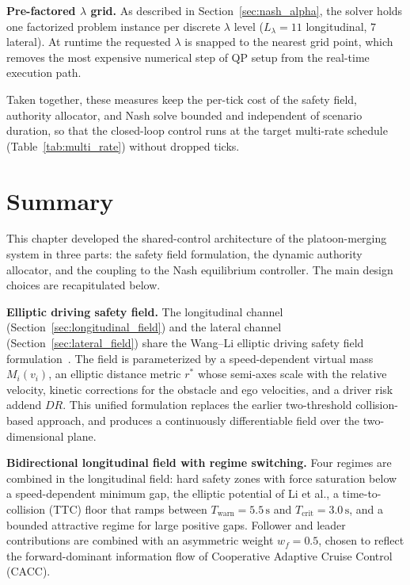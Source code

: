 \documentclass[12pt,a4paper,oneside]{report}
\begin{document}
\textbf{Pre-factored $\lambda$ grid.} As described in Section~\ref{sec:nash_alpha}, the solver holds one factorized problem instance per discrete $\lambda$ level ($L_\lambda = 11$ longitudinal, $7$ lateral). At runtime the requested $\lambda$ is snapped to the nearest grid point, which removes the most expensive numerical step of QP setup from the real-time execution path.

Taken together, these measures keep the per-tick cost of the safety field, authority allocator, and Nash solve bounded and independent of scenario duration, so that the closed-loop control runs at the target multi-rate schedule (Table~\ref{tab:multi_rate}) without dropped ticks.

\section{Summary}
\label{sec:chap3_summary}

This chapter developed the shared-control architecture of the platoon-merging system in three parts: the safety field formulation, the dynamic authority allocator, and the coupling to the Nash equilibrium controller. The main design choices are recapitulated below.

\textbf{Elliptic driving safety field.} The longitudinal channel (Section~\ref{sec:longitudinal_field}) and the lateral channel (Section~\ref{sec:lateral_field}) share the Wang--Li elliptic driving safety field formulation~\cite{wangDrivingSafetyField2015,wangDrivingSafetyField2016,liSharedControlNovel2019}. The field is parameterized by a speed-dependent virtual mass $M_i(v_i)$, an elliptic distance metric $r^{*}$ whose semi-axes scale with the relative velocity, kinetic corrections for the obstacle and ego velocities, and a driver risk addend $DR$. This unified formulation replaces the earlier two-threshold collision-based approach, and produces a continuously differentiable field over the two-dimensional plane.

\textbf{Bidirectional longitudinal field with regime switching.} Four regimes are combined in the longitudinal field: hard safety zones with force saturation below a speed-dependent minimum gap, the elliptic potential of Li et al., a time-to-collision (TTC) floor that ramps between $T_{\mathrm{warn}} = 5.5\,\mathrm{s}$ and $T_{\mathrm{crit}} = 3.0\,\mathrm{s}$, and a bounded attractive regime for large positive gaps. Follower and leader contributions are combined with an asymmetric weight $w_f = 0.5$, chosen to reflect the forward-dominant information flow of Cooperative Adaptive Cruise Control (CACC).
\end{document}

